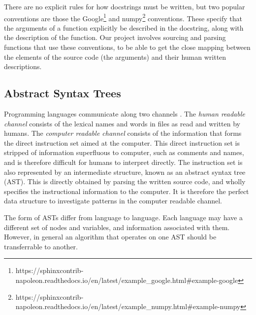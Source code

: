 There are no explicit rules for how docstrings must be written, but two popular conventions are those the Google\footnote{https://sphinxcontrib-napoleon.readthedocs.io/en/latest/example\_google.html\#example-google} and numpy\footnote{https://sphinxcontrib-napoleon.readthedocs.io/en/latest/example\_numpy.html\#example-numpy} conventions. These specify that the arguments of a function explicitly be described in the docstring, along with the description of the function.
Our project involves sourcing and parsing functions that use these conventions, to be able to get the close mapping between the elements of the source code (the arguments) and their human written descriptions. 


\subsection{Abstract Syntax Trees} %
\label{sub:abstract_syntax_trees}

Programming languages communicate along two channels \citep{allamanis_survey_2017}. The \textit{human readable channel} consists of the lexical names and words in files as read and written by humans.  The \textit{computer readable channel} consists of the information that forms the direct instruction set aimed at the computer.
This direct instruction set is stripped of information superfluous to computer, such as comments and names, and is therefore difficult for humans to interpret directly.
The instruction set is also represented by an intermediate structure, known as an abstract syntax tree (AST).
This is directly obtained by parsing the written source code, and wholly specifies the instructional information to the computer.
It is therefore the perfect data structure to investigate patterns in the computer readable channel.

The form of ASTs differ from language to language. 
Each language may have a different set of nodes and variables, and information associated with them.
However, in general an algorithm that operates on one AST should be transferrable to another. 



